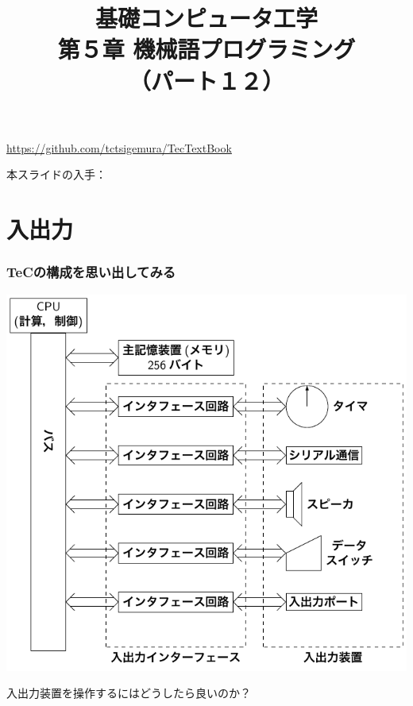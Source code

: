 \documentclass{beamer}                 %
\begin{document}
\title{基礎コンピュータ工学\\第５章 機械語プログラミング\\（パート１２）}
\date{}

\begin{frame}
  \titlepage
  \centerline{\url{https://github.com/tctsigemura/TecTextBook}}
  \vfill
  \centerline{本スライドの入手：
    }
\end{frame}


\section{入出力}
\begin{frame}
  \frametitle{TeCの構成を思い出してみる}
  \centerline{\includegraphics[scale=0.67]{../Tikz/kousei2.pdf}}
  入出力装置を操作するにはどうしたら良いのか？
\end{frame}
\end{document}
